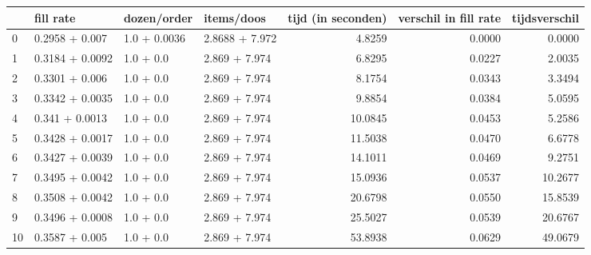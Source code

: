 \begin{tabular}{llllrrr}
\toprule
{} &        fill rate &   dozen/order &      items/doos &  tijd (in seconden) &  verschil in fill rate &  tijdsverschil \\
\midrule
0  &   0.2958 + 0.007 &  1.0 + 0.0036 &  2.8688 + 7.972 &              4.8259 &                 0.0000 &         0.0000 \\
1  &  0.3184 + 0.0092 &     1.0 + 0.0 &   2.869 + 7.974 &              6.8295 &                 0.0227 &         2.0035 \\
2  &   0.3301 + 0.006 &     1.0 + 0.0 &   2.869 + 7.974 &              8.1754 &                 0.0343 &         3.3494 \\
3  &  0.3342 + 0.0035 &     1.0 + 0.0 &   2.869 + 7.974 &              9.8854 &                 0.0384 &         5.0595 \\
4  &   0.341 + 0.0013 &     1.0 + 0.0 &   2.869 + 7.974 &             10.0845 &                 0.0453 &         5.2586 \\
5  &  0.3428 + 0.0017 &     1.0 + 0.0 &   2.869 + 7.974 &             11.5038 &                 0.0470 &         6.6778 \\
6  &  0.3427 + 0.0039 &     1.0 + 0.0 &   2.869 + 7.974 &             14.1011 &                 0.0469 &         9.2751 \\
7  &  0.3495 + 0.0042 &     1.0 + 0.0 &   2.869 + 7.974 &             15.0936 &                 0.0537 &        10.2677 \\
8  &  0.3508 + 0.0042 &     1.0 + 0.0 &   2.869 + 7.974 &             20.6798 &                 0.0550 &        15.8539 \\
9  &  0.3496 + 0.0008 &     1.0 + 0.0 &   2.869 + 7.974 &             25.5027 &                 0.0539 &        20.6767 \\
10 &   0.3587 + 0.005 &     1.0 + 0.0 &   2.869 + 7.974 &             53.8938 &                 0.0629 &        49.0679 \\
\bottomrule
\end{tabular}
